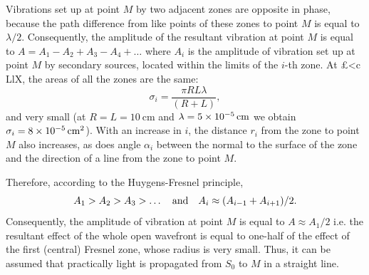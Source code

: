 Vibrations set up at point $M$ by two adjacent zones are opposite in phase, because the path difference from like points of these zones to point $M$ is equal to $\lambda/2$. Consequently, the amplitude of the resultant vibration at point $M$ is equal to $A = A_{1} - A_{2} + A_{3} - A_{4} + \dots$ where $A_{i}$ is the amplitude of vibration set
up at point $M$ by secondary sources, located within the limits of the $i$-th zone. At £<c LlX, the areas of all the zones are the same:
\begin{equation*}%
\sigma_{i} = \frac{\pi R L \lambda}{(R + L)}, 
\end{equation*}
and very small (at $R = L = \SI{10}{\centi\meter}$ and
$\lambda = \SI{5d-5}{\centi\meter}$ we obtain   $\sigma_{i} = \SI{8d-5}{\centi\meter\squared}$). With an increase in $i$, the distance $r_{i}$ from the zone to point $M$ also
increases, as does angle $\alpha_{i}$ between the normal to the surface of the zone and the direction of a line from the zone to point $M$.

Therefore, according to the Huygens-Fresnel principle, 
\begin{equation*}%
A_{1} > A_{2} > A_{3} > \dots \qand A_{i} \approx  ( A_{i-1} + A_{i+1})/2.
\end{equation*}
Consequently, the amplitude of vibration at point $M$ is equal to $A \approx A_{1}/2$ i.e. the resultant effect of the whole open wavefront is equal to one-half of the effect of the first (central) Fresnel zone, whose radius is very small. Thus, it can be assumed that practically light is propagated from $S_{0}$ to $M$ in a straight line.


